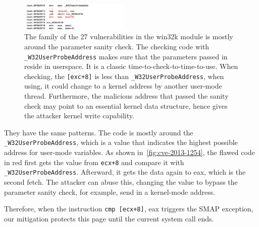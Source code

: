 \begin{figure}[th]
  \includegraphics[width=0.47\textwidth]{figures/cve-2013-1254}
  \centering
  \caption{The family of the 27 vulnerabilities in the win32k module is mostly around the parameter sanity check. The checking code with \texttt{\_W32UserProbeAddress} makes sure that the parameters passed in reside in userspace. It is a classic time-to-check-to-time-to-use. When checking, the \texttt{[exc+8]} is less than \texttt{\_W32UserProbeAddress}, when using, it could change to a kernel address by another user-mode thread. Furthermore, the malicious address that passed the sanity check may point to an essential kernel data structure, hence gives the attacker kernel write capability.}
  \label{fig:cve-2013-1254}
\end{figure}




They have the same patterns. The code is mostly around the \texttt{\_W32UserProbeAddress}, which is a value that indicates the highest possible address for user-mode variables. As shown in~\autoref{fig:cve-2013-1254}, the flawed code in red first gets the value from \texttt{ecx+8} and compare it with \texttt{\_W32UserProbeAddress}. Afterward, it gets the data again to eax, which is the second fetch. The attacker can abuse this, changing the value to bypass the parameter sanity check, for example, send in a kernel-mode address. 


Therefore, when the instruction \texttt{cmp [ecx+8]}, eax triggers the SMAP exception, our mitigation protects this page until the current system call ends.
